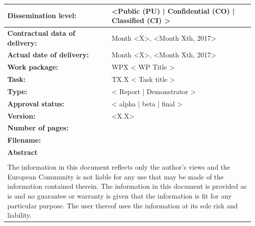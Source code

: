 \documentclass[12pt]{article}
\begin{document}
\begin{titlepage}
\begin{table}[h]
	\centering
	\begin{tabular}{|l|l|}
		\hline
		\cellcolor{lightgray}\textbf{Dissemination level:} & <Public (PU) | Confidential (CO) | Classified (CI) > \\
		\hline
		\cellcolor{lightgray}\textbf{Contractual data of delivery:} & Month <X>, <Month Xth, 2017>\\
		\hline
		\cellcolor{lightgray}\textbf{Actual date of delivery:} & Month <X>, <Month Xth, 2017> \\
		\hline
		\cellcolor{lightgray}\textbf{Work package:} & WPX < WP Title > \\
		\hline
		\cellcolor{lightgray}\textbf{Task:} & TX.X < Task title > \\
		\hline
		\cellcolor{lightgray}\textbf{Type:} & < Report | Demonstrator > \\
		\hline
		\cellcolor{lightgray}\textbf{Approval status:} & < alpha | beta | final > \\
		\hline
		\cellcolor{lightgray}\textbf{Version:} & <X.X> \\
		\hline
		\cellcolor{lightgray}\textbf{Number of pages:} & \pageref{LastPage} \\
		\hline
		\cellcolor{lightgray}\textbf{Filename:} & \currfilename \\
		\hline
		\multicolumn{2}{|l|}{\textbf{Abstract}}\\
		\multicolumn{2}{|p{\linewidth}|}{}\\
		\hline
		\multicolumn{2}{|p{\linewidth}|}{The information in this document reflects only the author’s views and the European Community is not liable for any use that may be made of the information contained therein. The information in this document is provided as is and no guarantee or warranty is given that the information is fit for any particular purpose.  The user thereof uses the information at its sole risk and liability.}\\
	\hline
	\end{tabular}
\end{table}
\\
\end{titlepage}
\end{document}
